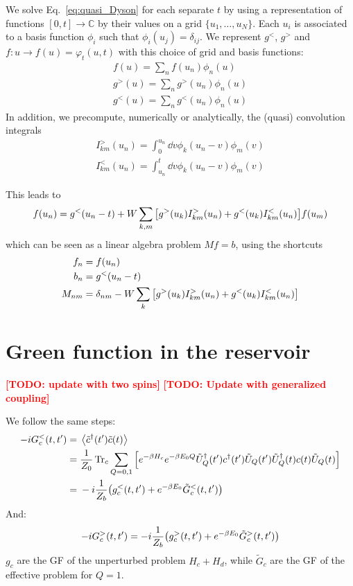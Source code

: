 \documentclass[12pt]{article}
\newcommand\TODO[1]{\textcolor{red}{\textbf{[TODO: #1]}}}
\begin{document}
We solve Eq.~\eqref{eq:quasi_Dyson} for each separate $t$ by using a representation of functions $[0, t] \rightarrow \mathbb{C}$ by their values on a grid $\{u_1, \ldots, u_N\}$. Each $u_i$ is associated to a basis function $\phi_i$ such that $\phi_i(u_j) = \delta_{ij}$. We represent $g^<$, $g^>$ and $f:u \rightarrow f(u) = \varphi_t(u, t)$ with this choice of grid and basis functions:
\begin{gather}
	f(u) = \sum_n f(u_n) \phi_n(u)
	\\
	g^>(u) = \sum_n g^>(u_n) \phi_n(u)
	\\
	g^<(u) = \sum_n g^<(u_n) \phi_n(u)
\end{gather}
In addition, we precompute, numerically or analytically, the (quasi) convolution integrals
\begin{gather}
	I^>_{km}(u_n) = \int_0^{u_n} \dd{v} \phi_k(u_n - v) \phi_m(v)
	\\
	I^<_{km}(u_n) = \int_{u_n}^t \dd{v} \phi_k(u_n - v) \phi_m(v)
\end{gather}

This leads to
\begin{equation}
	f(u_n) = g^<(u_n - t) + W \sum_{k,m} \qty[g^>(u_k) I^>_{km}(u_n) + g^<(u_k) I^<_{km}(u_n)] f(u_m)
\end{equation}
which can be seen as a linear algebra problem $M f = b$, using the shortcuts
\begin{align}
	f_n ={}& f(u_n)
	\\
	b_n ={}& g^<(u_n - t)
	\\
	M_{nm} ={}& \delta_{nm} - W \sum_k \qty[g^>(u_k) I^>_{km}(u_n) + g^<(u_k) I^<_{km}(u_n)]
\end{align}


\section{Green function in the reservoir}

\TODO{update with two spins}
\TODO{Update with generalized coupling}

We follow the same steps:
\begin{align}
	-i G^<_c(t, t') ={}& \expval{\tilde c^\dagger(t') \tilde c(t)}
	\\
	={}& \frac{1}{Z_0} \Tr_c \sum_{Q=0,1} \qty[e^{-\beta H_c} e^{-\beta E_0 Q} \tilde U_Q^\dagger(t') c^\dagger(t') \tilde U_Q(t') \tilde U_Q^\dagger(t) c(t) \tilde U_Q(t)]
	\\
	={}& -i \frac{1}{Z_b} \qty(g^<_c(t, t') + e^{-\beta E_0} \tilde G^<_c(t, t'))
\end{align}
And:
\begin{equation}
	-i G^>_c(t, t') = -i \frac{1}{Z_b} \qty(g^>_c(t, t') + e^{-\beta E_0} \tilde G^>_c(t, t'))
\end{equation}
$g_c$ are the \ac{GF} of the unperturbed problem $H_c + H_d$, while $\tilde G_c$ are the \ac{GF} of the effective problem for $Q=1$.
\end{document}
